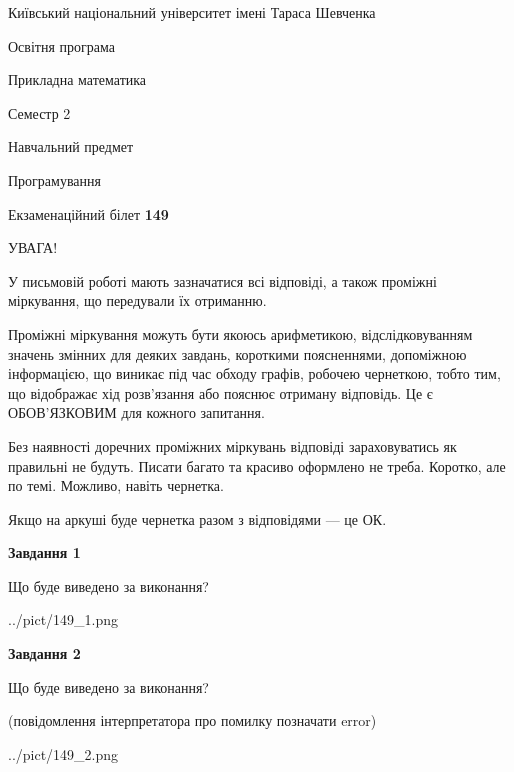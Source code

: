 \documentclass[12pt, ukrainian]{article}
\begin{document}
{{\begin {small}\par
{ \center  Київський національний університет імені Тараса Шевченка \par}
{\parbox {5 cm}{Освітня програма \hfill}{\parbox {7 cm}{Прикладна математика\hfill}}\parbox {6 cm}{\hfill Семестр 2}}\par
{\parbox {5 cm} {Навчальний предмет \hfill}\parbox {7 cm}{Програмування \hfill}\parbox {6cm}{\hfill}\par}\vspace{-7pt} \end{small}}{\center Екзаменаційний білет \No \textbf
{ 149 }\par}}
{
\begin {large}
УВАГА!

У письмовій роботі мають зазначатися всі відповіді, а також проміжні міркування, що передували їх отриманню.

Проміжні міркування можуть бути якоюсь арифметикою, відслідковуванням зна\-чень змінних для деяких завдань,
короткими поясненнями, допоміжною інформацією, що виникає під час обходу графів, робочею чернеткою,
тобто тим, що відображає хід розв’язання або пояснює отриману відповідь.
Це є ОБОВ’ЯЗКОВИМ для кожного запитання.

Без наявності доречних проміжних міркувань відповіді зараховуватись як правиль\-ні не будуть.
Писати багато та красиво оформлено не треба. Коротко, але по темі. Можли\-во, навіть чернетка.

Якщо на аркуші буде чернетка разом з відповідями --- це ОК.

\newpage

{\begin {center}\textbf{Завдання 1}\end {center}}\par
Що буде виведено за виконання?\par
\begin{center}
	{../pict/149_1.png}
\end{center}
\newpage

{\begin {center}\textbf{Завдання 2}\end {center}}\par
Що буде виведено за виконання?\par
 (повідомлення інтерпретатора про помилку позначати error)\par
\begin{center}
	{../pict/149_2.png}
\end{center}
\newpage


\end{large}}
\end{document}

